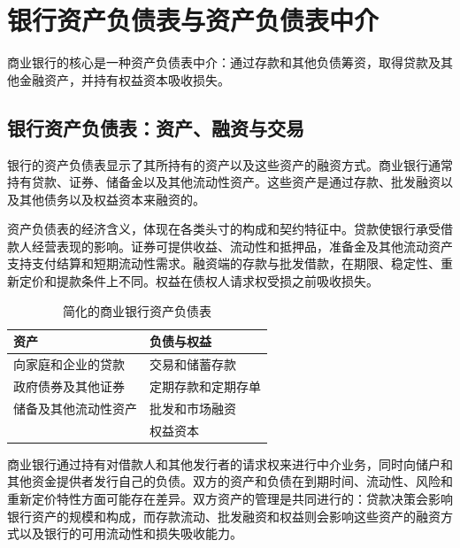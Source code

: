 \section{银行资产负债表与资产负债表中介}

商业银行的核心是一种资产负债表中介：通过存款和其他负债筹资，取得贷款及其他金融资产，并持有权益资本吸收损失。

\subsection{银行资产负债表：资产、融资与交易}

银行的资产负债表显示了其所持有的资产以及这些资产的融资方式。商业银行通常持有贷款、证券、储备金以及其他流动性资产。这些资产是通过存款、批发融资以及其他债务以及权益资本来融资的。

资产负债表的经济含义，体现在各类头寸的构成和契约特征中。贷款使银行承受借款人经营表现的影响。证券可提供收益、流动性和抵押品，准备金及其他流动资产支持支付结算和短期流动性需求。融资端的存款与批发借款，在期限、稳定性、重新定价和提款条件上不同。权益在债权人请求权受损之前吸收损失。

\begin{table}[H]

\centering

\caption{简化的商业银行资产负债表}

\label{tab:ch12-simplified-bank-balance-sheet}

\begin{tabularx}{0.82\textwidth}{@{}X X@{}}

\toprule

\textbf{资产} & \textbf{负债与权益} \\

\midrule

向家庭和企业的贷款 & 交易和储蓄存款 \\

政府债券及其他证券 & 定期存款和定期存单 \\

储备及其他流动性资产 & 批发和市场融资 \\

& 权益资本 \\

\bottomrule

\end{tabularx}

\end{table}

商业银行通过持有对借款人和其他发行者的请求权来进行中介业务，同时向储户和其他资金提供者发行自己的负债。双方的资产和负债在到期时间、流动性、风险和重新定价特性方面可能存在差异。双方资产的管理是共同进行的：贷款决策会影响银行资产的规模和构成，而存款流动、批发融资和权益则会影响这些资产的融资方式以及银行的可用流动性和损失吸收能力。

